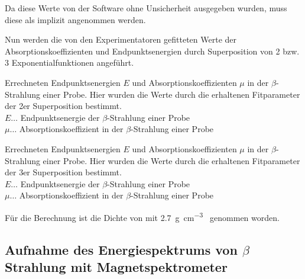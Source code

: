 \documentclass[12pt,english,ngerman]{scrartcl}
\begin{document}
Da diese Werte von der Software ohne Unsicherheit ausgegeben wurden, muss diese
als implizit angenommen werden.

Nun werden die von den Experimentatoren gefitteten Werte der
Absorptionskoeffizienten und Endpunktsenergien durch Superposition von 2 bzw. 3
Exponentialfunktionen angeführt.

\begin{table}[H]
	\caption[Absorptionskoeffizienten und Endpunktsenergien einer  Probe
		(2er Superposition Experimentatoren)]{
		Errechneten Endpunktsenergien $E$ und
		Absorptionskoeffizienten $\mu$ in  der $\beta$-Strahlung einer
		 Probe. Hier wurden die Werte durch die erhaltenen
		Fitparameter der 2er Superposition bestimmt.                                                                                   \\
		$E \dots$ Endpunktsenergie der $\beta$-Strahlung einer  Probe                    \\
		$\mu \dots$ Absorptionskoeffizient in  der $\beta$-Strahlung einer  Probe \\
	}\label{tab:abs_alu_2er}
	\centering
	
\end{table}

\begin{table}[H]
	\caption[Absorptionskoeffizienten und Endpunktsenergien einer  Probe
		(3er Superposition Experimentatoren)]{
		Errechneten Endpunktsenergien $E$ und
		Absorptionskoeffizienten $\mu$ in  der $\beta$-Strahlung einer
		 Probe. Hier wurden die Werte durch die erhaltenen
		Fitparameter der 3er Superposition bestimmt.                                                                                    \\
		$E \dots$ Endpunktsenergie der $\beta$-Strahlung einer  Probe                    \\
		$\mu \dots$ Absorptionskoeffizient in  der $\beta$-Strahlung einer  Probe \\
	}\label{tab:abs_alu_3er}
	\centering
	
\end{table}

Für die Berechnung ist die Dichte von  mit
\SI{2.7}{\gram\per\cm\cubed}~\cite{kuchling} genommen worden.

\subsection{Aufnahme des Energiespektrums von \texorpdfstring{$\beta$}{beta}
	Strahlung mit Magnetspektrometer}
\end{document}

